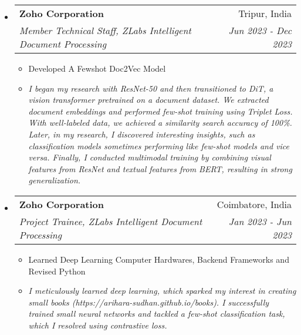 \documentclass[letterpaper,11pt]{article}
\makeatletter
\newcommand{\resitem}[1]{\item #1 \vspace{-2pt}}
\newcommand{\ressubheading}[4]{
\begin{tabular*}{6.5in}{l@{\extracolsep{\fill}}r}
    \textbf{#1} & #2 \\
    \textit{#3} & \textit{#4} \\
\end{tabular*}\vspace{-4pt}} %
\makeatother
\begin{document}
\begin{itemize}
\item[]
	\ressubheading{Zoho Corporation}{Tripur, India}{Member Technical Staff, ZLabs Intelligent Document Processing}{Jun 2023 - Dec 2023}
	\begin{itemize}
		\resitem{Developed A Fewshot Doc2Vec Model}
		\resitem{\textit{I began my research with ResNet-50 and then transitioned to DiT, a vision transformer pretrained on a document dataset. We extracted document embeddings and performed few-shot training using Triplet Loss. With well-labeled data, we achieved a similarity search accuracy of 100\%. Later, in my research, I discovered interesting insights, such as classification models sometimes performing like few-shot models and vice versa. Finally, I conducted multimodal training by combining visual features from ResNet and textual features from BERT, resulting in strong generalization.}}
	\end{itemize}

\item[]
	\ressubheading{Zoho Corporation}{Coimbatore, India}{Project Trainee, ZLabs Intelligent Document Processing}{Jan 2023 - Jun 2023}
	\begin{itemize}
		\resitem{Learned Deep Learning Computer Hardwares, Backend Frameworks and Revised Python}
		\resitem{\textit{I meticulously learned deep learning, which sparked my interest in creating small books (https://arihara-sudhan.github.io/books). I successfully trained small neural networks and tackled a few-shot classification task, which I resolved using contrastive loss.}}
	\end{itemize}

\end{itemize}
\end{document}
